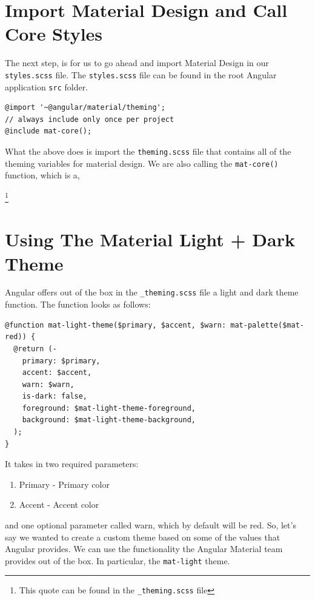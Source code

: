 \section{Import Material Design and Call Core Styles}
The next step, is for us to go ahead and import Material Design in our 
\lstinline{styles.scss} file. The \lstinline{styles.scss} file can be found
in the root Angular application \lstinline{src} folder.

\begin{lstlisting}[caption=styles.scss]
@import '~@angular/material/theming';
// always include only once per project
@include mat-core();
\end{lstlisting}


What the above does is import the \lstinline{theming.scss} file that contains
all of the theming variables for material design. We are also calling the
\lstinline{mat-core()} function, which is a, \begin{quote}
\end{quote} \footnote{This quote can be found in the \lstinline{_theming.scss}
file}

\section{ Using The Material Light + Dark Theme}
Angular offers out of the box in the \lstinline{_theming.scss} file a light and
dark theme function. The function looks as follows: 
\begin{lstlisting}
@function mat-light-theme($primary, $accent, $warn: mat-palette($mat-red)) {
  @return (-
    primary: $primary,
    accent: $accent,
    warn: $warn,
    is-dark: false,
    foreground: $mat-light-theme-foreground,
    background: $mat-light-theme-background,
  );
}  
\end{lstlisting}

It takes in two required parameters: 
\begin{enumerate}
  \item Primary - Primary color
  \item Accent - Accent color 
\end{enumerate}
and one optional parameter called warn, which by default will be red. So, let's
say we wanted to create a custom theme based on some of the values that 
Angular provides. We can use the functionality the Angular Material team 
provides out of the box. In particular, the \lstinline{mat-light} theme.

